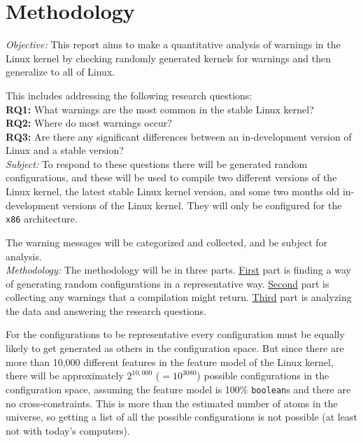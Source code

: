 \documentclass[a4paper,11pt]{report}
\begin{document}
\chapter{Methodology}

\emph{Objective:}
This report aims to make a quantitative analysis of warnings in  the
Linux kernel by checking randomly generated  kernels for warnings and 
then generalize to all of Linux.

This includes addressing the following research questions:
\\

\textbf{RQ1:} What warnings are the most common in the stable Linux kernel?
\\

\textbf{RQ2:} Where do most warnings occur?
\\

\textbf{RQ3:} Are there any significant differences between an in-development 
version of Linux and a stable version?
\\

\emph{Subject:}
To respond to these questions there will be generated random configurations, 
and these will be used to compile two different versions of the Linux kernel, 
the latest stable Linux kernel version, and some two months old in-development 
versions of the Linux kernel. They will only be configured for the \texttt{x86} architecture.

The warning messages will be categorized and collected, and be subject for 
analysis.
\\

\emph{Methodology:}
The methodology will be in three parts. \underline{First} part is finding a way of
generating random configurations in a representative way. \underline{Second} part is 
collecting any warnings that a compilation might return. \underline{Third} part is 
analyzing the data and answering the research questions.
\\

        \def \fn{Not counting cross-tree contraints, but also saying 
        everything is a \texttt{boolean} and not \texttt{tristate}, or 
        \texttt{string}.}

For the configurations to be representative every configuration must be equally 
likely to get generated as others in the configuration space. But since there are more than 
10,000 different features in the feature model of the Linux kernel, there will 
be approximately $2^{10,000}$ ($=10^{3080}$) possible configurations in the 
configuration space, assuming the feature model is 100\% \texttt{boolean}s and 
there are no cross-constraints.  This is more than the estimated number of 
atoms in the universe, so getting a list of all the possible configurations is 
not possible (at least not with today's computers).
\\
\end{document}
